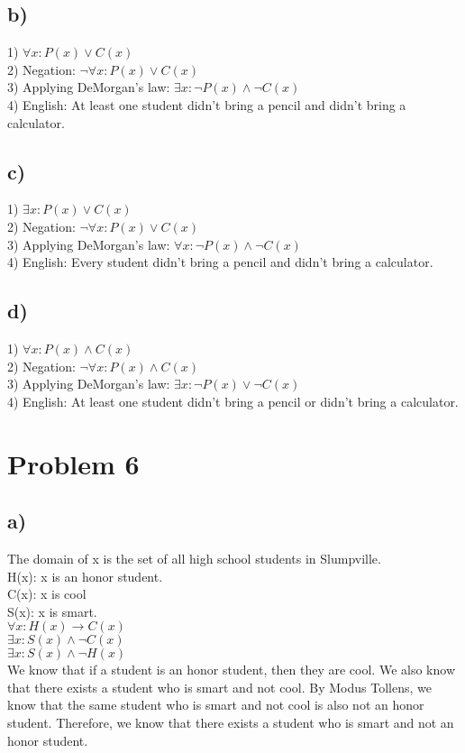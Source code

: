 \documentclass{article}
\begin{document}
\subsection*{b)}
1) $\forall x: P(x) \lor C(x)$\\
2) Negation: $\neg \forall x: P(x) \lor C(x)$\\
3) Applying DeMorgan's law: $\exists x: \neg P(x) \land \neg C(x)$\\
4) English: At least one student didn't bring a pencil and didn't bring a calculator.
\subsection*{c)}
1) $\exists x: P(x) \lor C(x)$\\
2) Negation: $\neg \forall x: P(x) \lor C(x)$\\
3) Applying DeMorgan's law: $\forall x: \neg P(x) \land \neg C(x)$\\
4) English: Every student didn't bring a pencil and didn't bring a calculator.
\subsection*{d)}
1) $\forall x: P(x) \land C(x)$\\
2) Negation: $\neg \forall x: P(x) \land C(x)$\\
3) Applying DeMorgan's law: $\exists x: \neg P(x) \lor \neg C(x)$\\
4) English: At least one student didn't bring a pencil or didn't bring a calculator.
\section*{Problem 6}
\subsection*{a)}
The domain of x is the set of all high school students in Slumpville.\\
H(x): x is an honor student.\\
C(x): x is cool\\
S(x): x is smart.\\
$\forall x: H(x) \rightarrow C(x)$\\
$\exists x: S(x) \land \neg C(x)$\\
$\exists x: S(x) \land \neg H(x)$\\
We know that if a student is an honor student, then they are cool. We also know that there exists a student who is smart and not cool. By Modus Tollens, we know that the same student who is smart and not cool is also not an honor student. Therefore, we know that there exists a student who is smart and not an honor student.
\end{document}
